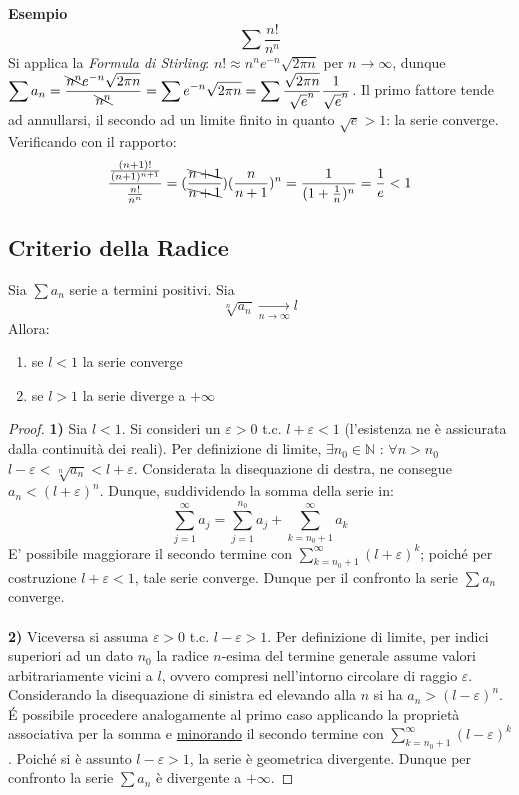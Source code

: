 \documentclass[10pt, oneside]{book}
\theoremstyle{plain}
\begin{document}
\textbf{Esempio}
\begin{equation*}
    \sum \frac{n!}{n^n}
\end{equation*}
Si applica la \textit{Formula di Stirling}: $n! \approx n^n e^{-n} \sqrt{2 \pi n}$ per $n \rightarrow \infty$, dunque $\displaystyle \sum a_n = \frac{\bcancel{n^n}e^{-n}\sqrt{2 \pi n}}{\bcancel{n^n}} = \sum e^{-n}\sqrt{2 \pi n} = \sum \frac{\sqrt{2 \pi n}}{\sqrt{e}^n} \frac{1}{\sqrt{e}^n}$. Il primo fattore tende ad annullarsi, il secondo ad un limite finito in quanto $\sqrt{e} > 1$: la serie converge.
\\Verificando con il rapporto: 
\begin{equation*}
    \frac{\frac{(n+1)!}{(n+1)^{n+1}}}{\frac{n!}{n^n}} = (\frac{\bcancel{n+1}}{\bcancel{n+1}})(\frac{n}{n+1})^n = \frac{1}{(1+\frac{1}{n})^n} = \frac{1}{e} < 1
\end{equation*}

\subsection{Criterio della Radice}
\begin{ther}
Sia $\sum a_n$ serie a termini positivi. Sia
\[\sqrt[n]{a_n} \xrightarrow[n \rightarrow \infty]{} l\]
Allora:
\begin{enumerate}
    \item se $l < 1$ la serie converge
    \item se $l > 1$ la serie diverge a $+ \infty$
\end{enumerate}
\end{ther}
\begin{proof}
\textbf{1)} Sia $l < 1$. Si consideri un $\varepsilon > 0$ t.c. $l + \varepsilon < 1$ (l'esistenza ne è assicurata dalla continuità dei reali). Per definizione di limite, $\exists n_0 \in \mathbb{N}$ : $\forall n > n_0$ $l - \varepsilon < \sqrt[n]{a_n} < l + \varepsilon$. Considerata la disequazione di destra, ne consegue $a_n < (l + \varepsilon)^n$. Dunque, suddividendo la somma della serie in:
\[\sum \limits_{j=1}^{\infty} a_j = \sum \limits_{j=1}^{n_0} a_j + \sum \limits_{k=n_0 + 1}^{\infty} a_k\]
E' possibile maggiorare il secondo termine con $\sum \limits_{k=n_0 + 1}^{\infty} (l + \varepsilon)^k$; poiché per costruzione $l + \varepsilon < 1$, tale serie converge. Dunque per il confronto la serie $\sum a_n$ converge.
\\~\\\textbf{2)} Viceversa si assuma $\varepsilon > 0$ t.c. $l - \varepsilon > 1$. Per definizione di limite, per indici superiori ad un dato $n_0$ la radice $n$-esima del termine generale assume valori arbitrariamente vicini a $l$, ovvero compresi nell'intorno circolare di raggio $\varepsilon$. Considerando la disequazione di sinistra ed elevando alla $n$ si ha $a_n > (l - \varepsilon)^n$. \'E possibile procedere analogamente al primo caso applicando la proprietà associativa per la somma e \underline{minorando} il secondo termine con $\sum_{k= n_0 + 1}^{\infty} (l - \varepsilon)^k$. Poiché si è assunto $l - \varepsilon > 1$, la serie è geometrica divergente. Dunque per confronto la serie $\sum a_n$ è divergente a $+ \infty$.
\end{proof}
\end{document}

